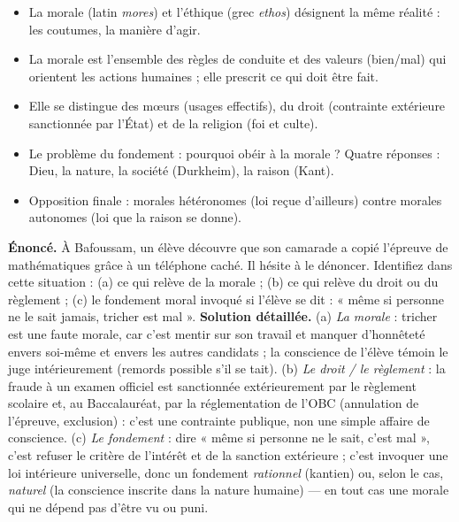 \documentclass[11pt]{article}
\begin{document}
\begin{aretenir}
\begin{itemize}
\item La morale (latin \emph{mores}) et l'éthique (grec \emph{ethos}) désignent la même réalité : les coutumes, la manière d'agir.
\item La morale est l'ensemble des règles de conduite et des valeurs (bien/mal) qui orientent les actions humaines ; elle prescrit ce qui doit être fait.
\item Elle se distingue des mœurs (usages effectifs), du droit (contrainte extérieure sanctionnée par l'État) et de la religion (foi et culte).
\item Le problème du fondement : pourquoi obéir à la morale ? Quatre réponses : Dieu, la nature, la société (Durkheim), la raison (Kant).
\item Opposition finale : morales hétéronomes (loi reçue d'ailleurs) contre morales autonomes (loi que la raison se donne).
\end{itemize}
\end{aretenir}

\begin{exoresolu}
\textbf{Énoncé.} À Bafoussam, un élève découvre que son camarade a copié l'épreuve de mathématiques grâce à un téléphone caché. Il hésite à le dénoncer. Identifiez dans cette situation : (a) ce qui relève de la morale ; (b) ce qui relève du droit ou du règlement ; (c) le fondement moral invoqué si l'élève se dit : « même si personne ne le sait jamais, tricher est mal ».
\tcblower
\textbf{Solution détaillée.} (a) \emph{La morale} : tricher est une faute morale, car c'est mentir sur son travail et manquer d'honnêteté envers soi-même et envers les autres candidats ; la conscience de l'élève témoin le juge intérieurement (remords possible s'il se tait). (b) \emph{Le droit / le règlement} : la fraude à un examen officiel est sanctionnée extérieurement par le règlement scolaire et, au Baccalauréat, par la réglementation de l'OBC (annulation de l'épreuve, exclusion) : c'est une contrainte publique, non une simple affaire de conscience. (c) \emph{Le fondement} : dire « même si personne ne le sait, c'est mal », c'est refuser le critère de l'intérêt et de la sanction extérieure ; c'est invoquer une loi intérieure universelle, donc un fondement \emph{rationnel} (kantien) ou, selon le cas, \emph{naturel} (la conscience inscrite dans la nature humaine) — en tout cas une morale qui ne dépend pas d'être vu ou puni.
\end{exoresolu}
\end{document}
